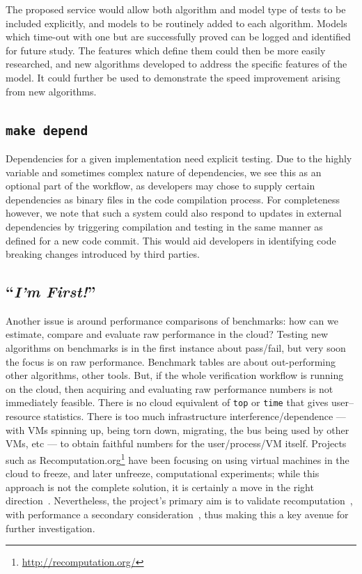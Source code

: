 \documentclass[conference]{IEEEtran}
\begin{document}
The proposed service would allow both algorithm and model type of
tests to be included explicitly, and models to be routinely added to
each algorithm. Models which time-out with one but are successfully
proved can be logged and identified for future study. The features
which define them could then be more easily researched, and new algorithms
developed to address the specific features of the model. It could
further be used to demonstrate the speed improvement arising from new
algorithms.

\subsection{{\texttt{make depend}}}

Dependencies for a given implementation need explicit testing. Due to
the highly variable and sometimes complex nature of dependencies, we
see this as an optional part of the workflow, as developers may chose
to supply certain dependencies as binary files in the code compilation
process. For completeness however, we note that such a system could
also respond to updates in external dependencies by triggering
compilation and testing in the same manner as defined for a new code
commit. This would aid developers in identifying code breaking changes
introduced by third parties.

\subsection{``{\emph{I'm First!}}''}

Another issue is around performance comparisons of benchmarks: how can
we estimate, compare and evaluate raw performance in the cloud? Testing new
algorithms on benchmarks is in the first instance about pass/fail, but
very soon the focus is on raw performance. Benchmark tables are about out-performing other
algorithms, other tools. But, if the whole verification workflow is
running on the cloud, then acquiring and evaluating raw performance numbers is not
immediately feasible. There is no cloud equivalent of {\texttt{top}} or
{\texttt{time}} that gives user--resource statistics. There is too
much infrastructure interference/dependence --- with VMs spinning up, being torn
down, migrating, the bus being used by other VMs, etc --- to obtain
faithful numbers for the user/process/VM itself. Projects such
as Recomputation.org\footnote{\url{http://recomputation.org/}} have
been focusing on using virtual machines in the cloud to freeze, and
later unfreeze, computational experiments; while this approach is not
the complete solution, it is certainly a move in the right
direction~\cite{arabas-et-al:2014}. Nevertheless, the project's
primary aim is to validate recomputation~\cite{gent:2013}, with
performance a secondary consideration~\cite{gent+kotthoff:2014}, thus
making this a key avenue for further investigation.
\end{document}
